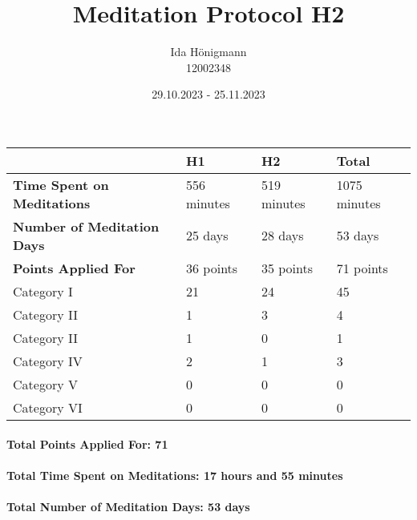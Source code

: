 \documentclass[11pt,a4paper]{article}
\begin{document}
\afterpage{\restorepagecolor}
\title{\LARGE\bfseries Meditation Protocol H2}
\author{Ida Hönigmann \\ 12002348}
\date{29.10.2023 - 25.11.2023}
\maketitle

\begin{tabular}{l|l|l|l}
	                                   & \textbf{H1} & \textbf{H2} & \textbf{Total}\\
	\hline
	\textbf{Time Spent on Meditations} & 556 minutes & 519 minutes & 1075 minutes  \\
	\textbf{Number of Meditation Days} & 25 days     & 28 days     & 53 days       \\
	\textbf{Points Applied For}        & 36 points   & 35 points   & 71 points     \\
	\hline
	Category I                         & 21          & 24          & 45            \\
	Category II                        & 1           & 3           & 4             \\
	Category II                        & 1           & 0           & 1             \\
	Category IV                        & 2           & 1           & 3             \\
	Category V                         & 0           & 0           & 0             \\
	Category VI                        & 0           & 0           & 0             \\
\end{tabular}

\paragraph{Total Points Applied For: 71}
\paragraph{Total Time Spent on Meditations: 17 hours and 55 minutes}
\paragraph{Total Number of Meditation Days: 53 days}

\end{document}
